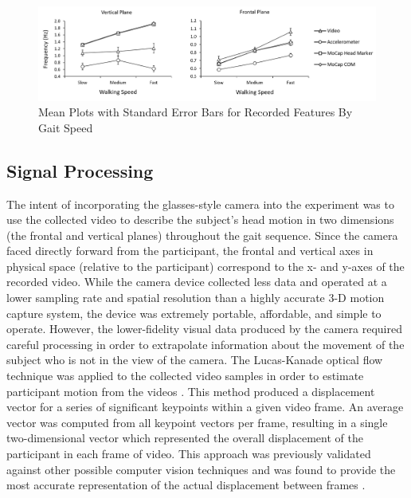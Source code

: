 \documentclass[12pt]{report}
\begin{document}
\begin{figure}
\centering
\includegraphics[width=7in]{figure/meanplots}
\caption{Mean Plots with Standard Error Bars for Recorded Features By Gait Speed}
\label{fig_meanPlots}
\end{figure}

\subsection{Signal Processing}
The intent of incorporating the glasses-style camera into the experiment was to use the collected video to describe the subject's head motion in two dimensions (the frontal and vertical planes) throughout the gait sequence. Since the camera faced directly forward from the participant, the frontal and vertical axes in physical space (relative to the participant) correspond to the x- and y-axes of the recorded video. While the camera device collected less data and operated at a lower sampling rate and spatial resolution than a highly accurate 3-D motion capture system, the device was extremely portable, affordable, and simple to operate. However, the lower-fidelity visual data produced by the camera required careful processing in order to extrapolate information about the movement of the subject who is not in the view of the camera. The Lucas-Kanade optical flow technique was applied to the collected video samples in order to estimate participant motion from the videos \cite{Lucas1981AnVision}. This method produced a displacement vector for a series of significant keypoints within a given video frame. An average vector was computed from all keypoint vectors per frame, resulting in a single two-dimensional vector which represented the overall displacement of the participant in each frame of video. This approach was previously validated against other possible computer vision techniques and was found to provide the most accurate representation of the actual displacement between frames \cite{Schneider2017PreliminaryProcessing}.
\end{document}

